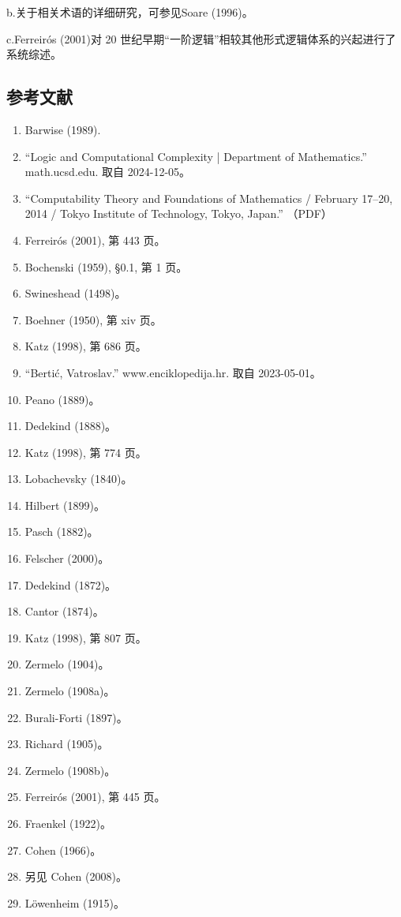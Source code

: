 b.关于相关术语的详细研究，可参见Soare (1996)。

c.Ferreirós (2001)对 20 世纪早期“一阶逻辑”相较其他形式逻辑体系的兴起进行了系统综述。
\subsection{参考文献}
\begin{enumerate}
  \item Barwise (1989).
  \item “Logic and Computational Complexity | Department of Mathematics.” math.ucsd.edu. 取自 2024-12-05。
  \item “Computability Theory and Foundations of Mathematics / February 17–20, 2014 / Tokyo Institute of Technology, Tokyo, Japan.” （PDF）
  \item Ferreirós (2001), 第 443 页。
  \item Bochenski (1959), §0.1, 第 1 页。
  \item Swineshead (1498)。
  \item Boehner (1950), 第 xiv 页。
  \item Katz (1998), 第 686 页。
  \item “Bertić, Vatroslav.” www.enciklopedija.hr. 取自 2023-05-01。
  \item Peano (1889)。
  \item Dedekind (1888)。
  \item Katz (1998), 第 774 页。
  \item Lobachevsky (1840)。
  \item Hilbert (1899)。
  \item Pasch (1882)。
  \item Felscher (2000)。
  \item Dedekind (1872)。
  \item Cantor (1874)。
  \item Katz (1998), 第 807 页。
  \item Zermelo (1904)。
  \item Zermelo (1908a)。
  \item Burali-Forti (1897)。
  \item Richard (1905)。
  \item Zermelo (1908b)。
  \item Ferreirós (2001), 第 445 页。
  \item Fraenkel (1922)。
  \item Cohen (1966)。
  \item 另见 Cohen (2008)。
  \item Löwenheim (1915)。

\end{enumerate}
